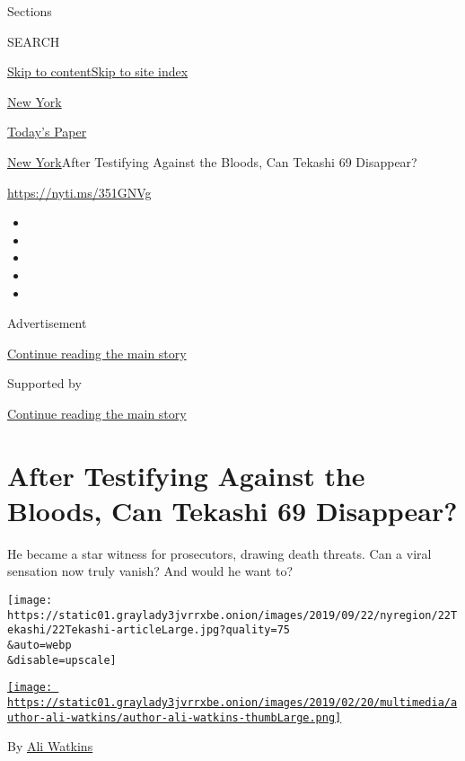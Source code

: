 Sections

SEARCH

\protect\hyperlink{site-content}{Skip to
content}\protect\hyperlink{site-index}{Skip to site index}

\href{https://www.nytimes3xbfgragh.onion/section/nyregion}{New York}

\href{https://myaccount.nytimes3xbfgragh.onion/auth/login?response_type=cookie\&client_id=vi}{}

\href{https://www.nytimes3xbfgragh.onion/section/todayspaper}{Today's
Paper}

\href{/section/nyregion}{New York}\textbar{}After Testifying Against the
Bloods, Can Tekashi 69 Disappear?

\url{https://nyti.ms/351GNVg}

\begin{itemize}
\item
\item
\item
\item
\item
\end{itemize}

Advertisement

\protect\hyperlink{after-top}{Continue reading the main story}

Supported by

\protect\hyperlink{after-sponsor}{Continue reading the main story}

\hypertarget{after-testifying-against-the-bloods-can-tekashi-69-disappear}{%
\section{After Testifying Against the Bloods, Can Tekashi 69
Disappear?}\label{after-testifying-against-the-bloods-can-tekashi-69-disappear}}

He became a star witness for prosecutors, drawing death threats. Can a
viral sensation now truly vanish? And would he want to?

\texttt{[image: https://static01.graylady3jvrrxbe.onion/images/2019/09/22/nyregion/22Tekashi/22Tekashi-articleLarge.jpg?quality=75\\\&auto=webp\\\&disable=upscale]}

\href{https://www.nytimes3xbfgragh.onion/by/ali-watkins}{\texttt{[image: https://static01.graylady3jvrrxbe.onion/images/2019/02/20/multimedia/author-ali-watkins/author-ali-watkins-thumbLarge.png]}}

By \href{https://www.nytimes3xbfgragh.onion/by/ali-watkins}{Ali Watkins}

